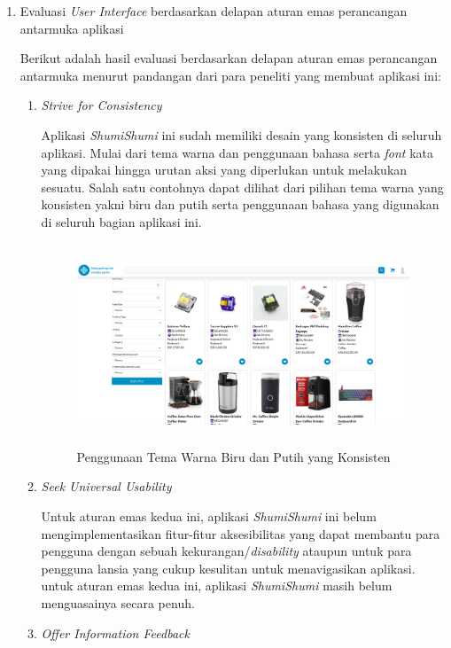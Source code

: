 \documentclass[a4paper]{article}
\begin{document}
\begin{enumerate}
    \item Evaluasi \textit{User Interface} berdasarkan delapan aturan emas perancangan antarmuka aplikasi
    
    Berikut adalah hasil evaluasi berdasarkan delapan aturan emas perancangan antarmuka menurut pandangan dari para peneliti yang membuat aplikasi ini:
    
    \begin{enumerate}
        \item \textit{Strive for Consistency}
        
        Aplikasi \textit{ShumiShumi} ini sudah memiliki desain yang konsisten di seluruh aplikasi. Mulai dari tema warna dan penggunaan bahasa serta \textit{font} kata yang dipakai hingga urutan aksi yang diperlukan untuk melakukan sesuatu. Salah satu contohnya dapat dilihat dari pilihan tema warna yang konsisten yakni biru dan putih serta penggunaan bahasa yang digunakan di seluruh bagian aplikasi ini. 

        \begin{figure}[h]
            \centering
            \includegraphics*[height=6cm]{images/prosedur pengunaan aplikasi/Search.png}
            \caption{Penggunaan Tema Warna Biru dan Putih yang Konsisten}
        \end{figure}

        \item \textit{Seek Universal Usability}
        
        Untuk aturan emas kedua ini, aplikasi \textit{ShumiShumi} ini belum mengimplementasikan fitur-fitur aksesibilitas yang dapat membantu para pengguna dengan sebuah kekurangan/\textit{disability} ataupun untuk para pengguna lansia yang cukup kesulitan untuk menavigasikan aplikasi. untuk aturan emas kedua ini, aplikasi \textit{ShumiShumi} masih belum menguasainya secara penuh. 

        \item \textit{Offer Information Feedback}
        

\end{enumerate}
\end{enumerate}
\end{document}
